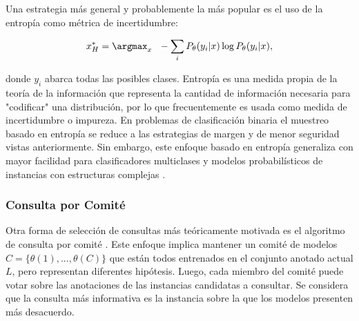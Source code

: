 %
%

Una estrategia más general y probablemente la más popular es el uso de la entropía \cite{shannon1948maththeory} como métrica de incertidumbre:

\begin{equation}
x_{H}^* =  \argmax_x \ \ - \sum_i {P_{\theta}(y_i|x) \log{P_{\theta}(y_i|x)}},
\end{equation}

donde $y_i$  abarca todas las posibles clases. Entropía es una medida propia de la teoría de la información que representa la cantidad de información necesaria para "codificar" una distribución, por lo que frecuentemente es usada como medida de incertidumbre o impureza. En problemas de clasificación binaria el muestreo basado en entropía se reduce a las estrategias de margen y  de menor seguridad vistas anteriormente. Sin embargo, este enfoque basado en entropía generaliza con mayor facilidad para clasificadores multiclases y modelos probabilísticos de instancias con estructuras complejas .

\subsubsection{Consulta por Comité}

Otra forma de selección de consultas más teóricamente motivada  es el algoritmo de consulta por comité \cite{seung1992query}. Este enfoque implica mantener un comité de modelos $ C = \{ \theta (1) , . . . , \theta(C) \} $ que están todos entrenados en el conjunto anotado actual $L$, pero representan diferentes hipótesis. Luego, cada miembro del comité puede votar sobre las anotaciones de las instancias candidatas a consultar. Se considera que la consulta más informativa es la instancia sobre la que los modelos presenten más desacuerdo.

